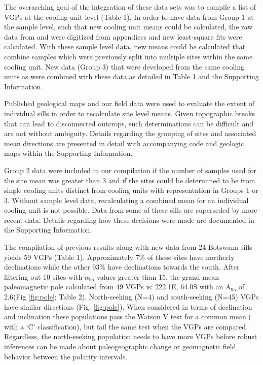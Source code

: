 \documentclass[11pt,letterpaper]{article}
\begin{document}
The overarching goal of the integration of these data sets was to compile a list of VGPs at the cooling unit level (Table 1). In order to have data from Group 1 at the sample level, such that new cooling unit means could be calculated, the raw data from \cite{Pancake2001a} and \cite{Seidel2004a} were digitized from appendices and new least-square fits were calculated. With these sample level data, new means could be calculated that combine samples which were previously split into multiple sites within the same cooling unit. New data (Group 3) that were developed from the same cooling units as \cite{Pancake2001a} were combined with these data as detailed in Table 1 and the Supporting Information.

Published geological maps and our field data were used to evaluate the extent of individual sills in order to recalculate site level means. Given topographic breaks that can lead to disconnected outcrops, such determinations can be difficult and are not without ambiguity. Details regarding the grouping of sites and associated mean directions are presented in detail with accompanying code and geologic maps within the Supporting Information.

Group 2 data were included in our compilation if the number of samples used for the site mean was greater than 3 and if the sites could be determined to be from single cooling units distinct from cooling units with representation in Groups 1 or 3. Without sample level data, recalculating a combined mean for an individual cooling unit is not possible. Data from some of these sills are superseded by more recent data. Details regarding how these decisions were made are documented in the Supporting Information.

The compilation of previous results along with new data from 24 Botswana sills yields 59 VGPs (Table 1). Approximately 7$\%$ of these sites have northerly declinations while the other 93$\%$ have declinations towards the south. After filtering out 10 sites with $\alpha_{95}$ values greater than 15\textdegree, the grand mean paleomagnetic pole calculated from 49 VGPs is: 222.1\textdegree E, 64.0\textdegree S with an A$_{95}$ of 2.6\textdegree (Fig \ref{fig:pole}; Table 2). North-seeking (N=4) and south-seeking (N=45) VGPs have similar directions (Fig. \ref{fig:pole}). When considered in terms of declination and inclination these populations pass the Watson V test for a common mean (\cite{Watson1956a} with a \cite{McFadden1990a} `C' classification), but fail the same test when the VGPs are compared. Regardless, the north-seeking population needs to have more VGPs before robust inferences can be made about paleogeographic change or geomagnetic field behavior between the polarity intervals. 
\end{document}
